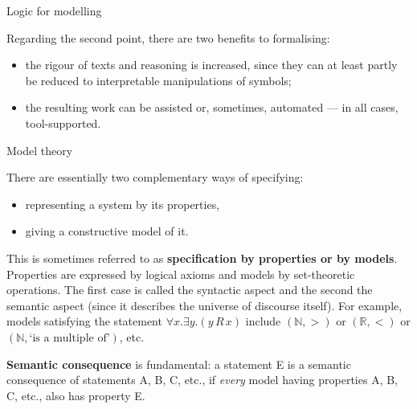 \documentclass[compress,dvips,xcolor={dvipsnames},t]{beamer}
\begin{document}
%
\begin{frame}{Logic for modelling}

Regarding the second point, there are two benefits to formalising:
\begin{itemize}

  \item the rigour of texts and reasoning is increased, since they
  can at least partly be reduced to interpretable manipulations of
  symbols;

  \item the resulting work can be assisted or, sometimes,
  automated --- in all cases, tool-supported.

\end{itemize}

\end{frame}

%
\begin{frame}{Model theory}

There are essentially two complementary ways of specifying:
\begin{itemize}

  \item representing a system by its properties,

  \item giving a constructive model of it.

\end{itemize}

This is sometimes referred to as \textbf{specification by properties
  or by models}. Properties are expressed by logical axioms and models
by set\hyp{}theoretic operations. The first case is called the
syntactic aspect and the second the semantic aspect (since it
describes the universe of discourse itself). For example, models
satisfying the statement $\forall x.\exists y.(y \, R \, x)$ include
$(\mathbb{N},>)$ or $(\mathbb{R},<)$ or $(\mathbb{N},\mbox{`is a
  multiple of'})$, etc.

\bigskip

\textbf{Semantic consequence} is fundamental: a statement E is a
semantic consequence of statements A, B, C, etc., if \emph{every}
model having properties A, B, C, etc., also has property E.

\end{frame}
\end{document}
